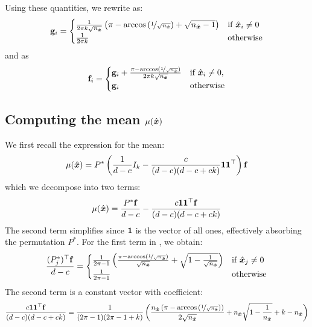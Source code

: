 Using these quantities, we rewrite  as:
\begin{equation*}
    \mathbf{g}_i = \begin{cases}
        \frac{1}{2\pi k\sqrt{n_{\hat{\boldsymbol{x}}}}}\left(\pi-\arccos\left(\nicefrac{1}{\sqrt{n_{\hat{\boldsymbol{x}}}}}\right) + \sqrt{n_{\hat{\boldsymbol{x}}}-1}\right) &\textrm{if } \hat{\boldsymbol{x}}_i \neq 0\\
        \frac{1}{2\pi k} &\textrm{otherwise}
    \end{cases}
\end{equation*}
and  as
\begin{equation*}
    \mathbf{f}_i = \begin{cases}
        \mathbf{g}_i + \frac{\pi-\arccos\left(\nicefrac{1}{\sqrt{n_{\hat{\boldsymbol{x}}}}}\right)}{2\pi k \sqrt{n_{\hat{\boldsymbol{x}}}}} &\textrm{if } \hat{\boldsymbol{x}}_i \neq 0,\\
        \mathbf{g}_i &\textrm{otherwise}
    \end{cases}
\end{equation*}

\subsection{Computing the mean $\mu(\hat{\boldsymbol{x}})$}
We first recall the expression for the mean:
\begin{equation*}
    \mu(\hat{\boldsymbol{x}}) = P^*\left(\frac{1}{d-c} I_k - \frac{c}{(d-c)(d-c+ck)}\boldsymbol{1}\boldsymbol{1}^\top\right)\mathbf{f}
\end{equation*}
which we decompose into two terms:
\begin{equation}
    \label{eq:mu_decomposed}
    \mu(\hat{\boldsymbol{x}}) = \frac{P^*\mathbf{f}}{d-c}  - \frac{c\boldsymbol{1}\boldsymbol{1}^\top\mathbf{f}}{(d-c)(d-c+ck)}
\end{equation}
The second term simplifies since $\boldsymbol{1}$ is the vector of all ones, effectively absorbing the permutation $P^*$.
For the first term in , we obtain:
\begin{equation*}
        \frac{(P_j^*)^\top\mathbf{f}}{d-c} = \begin{cases}
        \frac{1}{2\pi-1}\left(
        \frac{\pi-\arccos\left(\nicefrac{1}{\sqrt{n_{\hat{\boldsymbol{x}}}}}\right)}{\sqrt{n_{\hat{\boldsymbol{x}}}}}
        +\sqrt{1-\frac{1}{\sqrt{n_{\hat{\boldsymbol{x}}}}}}\right)
         &\textrm{if } \hat{\boldsymbol{x}}_j \neq 0\\
        \frac{1}{2\pi-1} &\textrm{otherwise}
    \end{cases}
\end{equation*}
The second term is a constant vector with coefficient:
\begin{equation*}
    \frac{c\boldsymbol{1}\boldsymbol{1}^\top\mathbf{f}}{(d-c)(d-c+ck)} = \frac{1}{(2\pi-1)(2\pi-1+k)}\left(\frac{n_{\hat{\boldsymbol{x}}}\left(\pi-\arccos\left(\nicefrac{1}{\sqrt{n_{\hat{\boldsymbol{x}}}}}\right)\right)}{2 \sqrt{n_{\hat{\boldsymbol{x}}}}}+n_{\hat{\boldsymbol{x}}}\sqrt{1-\frac{1}{n_{\hat{\boldsymbol{x}}}}}+k-n_{\hat{\boldsymbol{x}}}\right)
\end{equation*}


